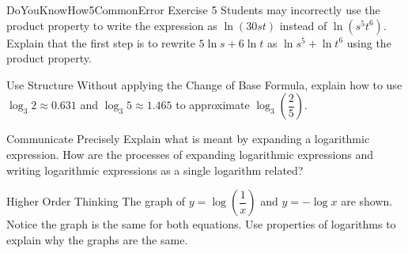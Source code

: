 \documentclass{article}
\newenvironment{practice}[2]{}{}        %
\newenvironment{te-addendum}[2]{}{}     %
\newcommand{\answer}[1]{}               %
\begin{document}
\begin{te-addendum}{DoYouKnowHow5}{CommonError}
Exercise 5 Students may incorrectly use the product property to write the expression as $\ln(30st)$ instead of $\ln(s^5t^6)$. Explain that the first step is to rewrite $5\ln s+6\ln t$ as $\ln s^5+\ln t^6$ using the product property.
\end{te-addendum}

\begin{practice}{7}{2}
Use Structure Without applying the Change of Base Formula, explain how to use $\log_3 2\approx0.631$ and $\log_3 5\approx1.465$ to approximate $\log_3\left(\dfrac{2}{5}\right)$.

\answer{Use the Quotient Property to rewrite $\log_3\left(\dfrac{2}{5}\right)$ as $\log_3 2-\log_3 5$. Substitute 0.631 for $\log_3 2$ and 1.465 for $\log_3 5$, then subtract to approximate the logarithm as $-0.834$.}
\end{practice}

\begin{practice}{8}{2}
Communicate Precisely Explain what is meant by expanding a logarithmic expression. How are the processes of expanding logarithmic expressions and writing logarithmic expressions as a single logarithm related?

\answer{To expand, separate the factors inside the logarithm into separate sums of logarithms. To write a single logarithmic expression, combine sums of logarithms into a single logarithm of the product.}
\end{practice}

\begin{practice}{9}{2}
Higher Order Thinking The graph of $y=\log\left(\dfrac{1}{x}\right)$ and $y=-\log x$ are shown. Notice the graph is the same for both equations. Use properties of logarithms to explain why the graphs are the same.


\answer{$y=\log\left(\dfrac{1}{x}\right)=\log1-\log x=0-\log x=-\log x$}
\end{practice}
\end{document}
